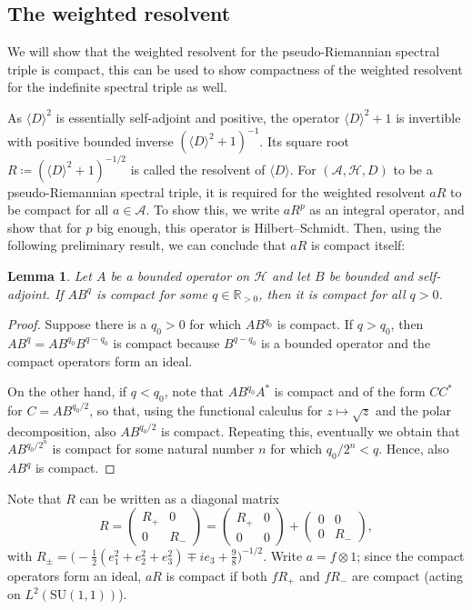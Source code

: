 \documentclass{amsart}
\newtheorem{lemma}[theorem]{Lemma}
\theoremstyle{definition}
\theoremstyle{remark}
\numberwithin{equation}{section}
\begin{document}
\subsection{The weighted resolvent}
We will show that the weighted resolvent for the pseudo-Riemannian spectral triple is compact, this can be used to show compactness of the weighted resolvent for the indefinite spectral triple as well. 

As $\langle D\rangle^2$ is essentially self-adjoint and positive, the operator $\langle D\rangle^2+1$ is invertible with positive bounded inverse $(\langle D\rangle^2+1)^{-1}$. Its square root $R\coloneq(\langle D\rangle^2+1)^{-1/2}$ is called the resolvent of $\langle D\rangle$. For $(\mathcal{A},\mathcal{H},D)$ to be a pseudo-Riemannian spectral triple, it is required for the weighted resolvent $aR$ to be compact for all $a\in\mathcal{A}$. To show this, we write $aR^p$ as an integral operator, and show that for $p$ big enough, this operator is Hilbert--Schmidt. Then, using the following preliminary result, we can conclude that $aR$ is compact itself:

\begin{lemma}\label{compactness_powers}
    Let $A$ be a bounded operator on $\mathcal{H}$ and let $B$ be bounded and self-adjoint. If $AB^q$ is compact for some $q\in\mathbb{R}_{>0}$, then it is compact for all $q>0$.
\end{lemma}
\begin{proof}
    Suppose there is a $q_0>0$ for which $AB^{q_0}$ is compact. If $q>q_0$, then $AB^q=AB^{q_0}B^{q-q_0}$ is compact because $B^{q-q_0}$ is a bounded operator and the compact operators form an ideal. 

    On the other hand, if $q<q_0$, note that $AB^{q_0}A^*$ is compact and of the form $CC^*$ for $C=AB^{q_0/2}$, so that, using the functional calculus for $z\mapsto\sqrt{z}$ and the polar decomposition, also $AB^{q_0/2}$ is compact. Repeating this, eventually we obtain that $AB^{q_0/2^n}$ is compact for some natural number $n$ for which $q_0/2^n<q$. Hence, also $AB^q$ is compact.
\end{proof}

Note that $R$ can be written as a diagonal matrix 
\begin{equation}
    R=\begin{pmatrix} R_+ & 0 \\ 0 & R_- \end{pmatrix}=\begin{pmatrix}R_+ & 0 \\ 0 & 0 \end{pmatrix}+\begin{pmatrix} 0 & 0 \\ 0 & R_- \end{pmatrix},
\end{equation}
with $R_\pm=\Big(-\tfrac{1}{2}(e_1^2+e_2^2+e_3^2)\mp ie_3+\tfrac{9}{8}\Big)^{-1/2}$. Write $a=f\otimes 1$; since the compact operators form an ideal, $aR$ is compact if both $fR_+$ and $fR_-$ are compact (acting on $L^2(\mathrm{SU}(1,1))$).
\end{document}
